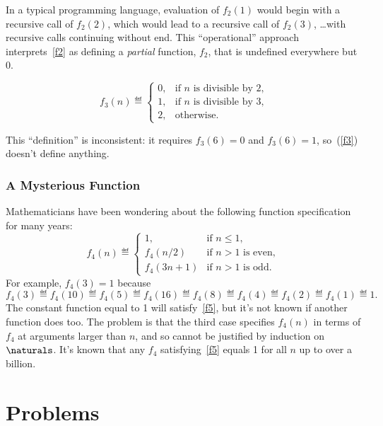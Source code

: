 In a typical programming language, evaluation of $f_2(1)$ would begin with
a recursive call of $f_2(2)$, which would lead to a recursive call of
$f_2(3)$, \dots with recursive calls continuing without end.  This
``operational'' approach interprets~\eqref{f2} as defining a
\emph{partial} function, $f_2$, that is undefined everywhere but 0.

\begin{definition}
\begin{equation}\label{f3}
f_3(n) \eqdef \begin{cases}
  0, &  \text{if $n$ is divisible by 2,}\\
  1, &  \text{if $n$ is divisible by 3,}\\
  2, & \text{otherwise.}
 \end{cases}
\end{equation}
\end{definition}
This ``definition'' is inconsistent: it requires $f_3(6) = 0$ and $f_3(6)
=1$, so~(\ref{f3}) doesn't define anything.

\subsubsection{A Mysterious Function}
Mathematicians have been wondering about the following function
specification for many years:
\begin{equation}\label{f5}
f_4(n) \eqdef\begin{cases}
 1, & \text{if $n\le 1$},\\
 f_4(n/2) &  \text{if $n>1$ is even},\\
 f_4(3n+1)& \text{if $n>1$ is odd}.
\end{cases}
\end{equation}
For example, $f_4(3)=1$ because
\[
f_4(3)\eqdef f_4(10)\eqdef f_4(5)\eqdef f_4(16)\eqdef f_4(8)\eqdef
f_4(4)\eqdef f_4(2)\eqdef f_4(1)\eqdef 1.
\]
The constant function equal to 1 will satisfy~\eqref{f5}, but it's not
known if another function does too.  The problem is that the third case
specifies $f_4(n)$ in terms of $f_4$ at arguments larger than $n$, and so
cannot be justified by induction on $\naturals$.  It's known that any
$f_4$ satisfying~\eqref{f5} equals 1 for all $n$ up to over a billion.


\section{Problems}

